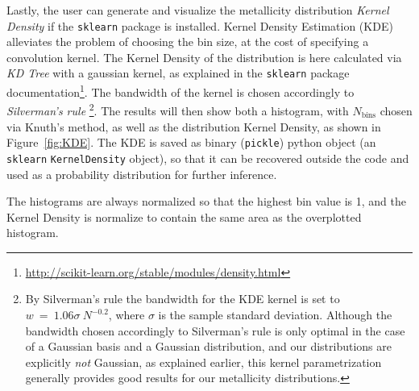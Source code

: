\documentclass{emulateapj}
\begin{document}
Lastly, the user can generate and visualize the metallicity distribution \emph{Kernel Density} if the \verb=sklearn= package is installed. Kernel Density Estimation (KDE) alleviates the problem of choosing the bin size, at the cost of specifying a convolution kernel. The Kernel Density of the distribution is here calculated via \emph{KD Tree} with a gaussian kernel, as explained in the \verb=sklearn= package documentation\footnote{\url{http://scikit-learn.org/stable/modules/density.html}}. The bandwidth of the kernel is chosen accordingly to \emph{Silverman's rule} \citep{silverman86}\footnote{By Silverman's rule the bandwidth for the KDE kernel is set to $w~=~1.06\sigma~N^{-0.2}$, where $\sigma$ is the sample standard deviation. Although the bandwidth chosen accordingly to Silverman's rule is only optimal in the case of a Gaussian basis and a Gaussian distribution, and our distributions are explicitly \emph{not} Gaussian, as explained earlier, this kernel parametrization generally provides good results for our metallicity distributions.}. The results will then show both a histogram, with $N_\mathrm{bins}$ chosen via Knuth's method, as well as the distribution Kernel Density, as shown in Figure~\ref{fig:KDE}. The KDE is saved as binary (\verb=pickle=) python object (an \verb=sklearn= \verb=KernelDensity= object), so that it can be recovered outside the code and used as a probability distribution for further inference.

The histograms are always normalized so that the highest bin value is 1, and the  Kernel Density is normalize to contain the same area as the overplotted histogram. %
\end{document}
